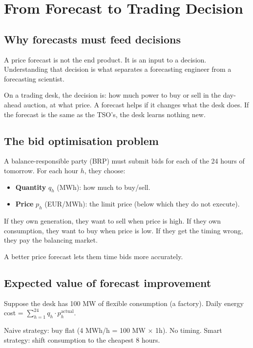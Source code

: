 \section{From Forecast to Trading Decision}

\subsection{Why forecasts must feed decisions}

A price forecast is not the end product. It is an input to a decision.
Understanding that decision is what separates a forecasting engineer
from a forecasting scientist.

On a trading desk, the decision is: how much power to buy or sell
in the day-ahead auction, at what price.
A forecast helps if it changes what the desk does.
If the forecast is the same as the TSO's, the desk learns nothing new.

\subsection{The bid optimisation problem}

A balance-responsible party (BRP) must submit bids for each of the 24
hours of tomorrow. For each hour $h$, they choose:

\begin{itemize}
  \item \textbf{Quantity} $q_h$ (MWh): how much to buy/sell.
  \item \textbf{Price} $p_h$ (EUR/MWh): the limit price (below which they do not execute).
\end{itemize}

If they own generation, they want to sell when price is high.
If they own consumption, they want to buy when price is low.
If they get the timing wrong, they pay the balancing market.

A better price forecast lets them time bids more accurately.

\subsection{Expected value of forecast improvement}

Suppose the desk has 100 MW of flexible consumption (a factory).
Daily energy cost = $\sum_{h=1}^{24} q_h \cdot p_h^{\text{actual}}$.

Naive strategy: buy flat (4 MWh/h = 100 MW $\times$ 1h). No timing.
Smart strategy: shift consumption to the cheapest 8 hours.

